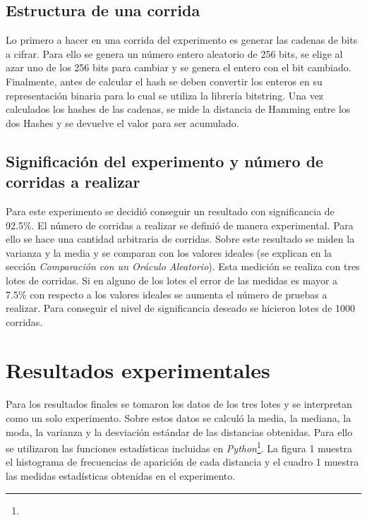 \documentclass[a4paper]{article}
\begin{document}
\subsection{Estructura de una corrida}
Lo primero a hacer en una corrida del experimento es generar las cadenas de bits a cifrar. Para ello se genera un número 
entero aleatorio de 256 bits, se elige al azar uno de los 256 bits para cambiar y se genera el entero con el bit cambiado. 
Finalmente, antes de calcular el hash se deben convertir los enteros en su representación binaria para lo cual se utiliza 
la librería bitstring. Una vez calculados los hashes de las cadenas, se mide la distancia de Hamming 
entre los dos Hashes y se devuelve el valor para ser acumulado.
 
 \subsection{Significación del experimento y número de corridas a realizar}
 Para este experimento se decidió conseguir un resultado con significancia de 92.5\%. El número de corridas a realizar 
 se definió de manera experimental. Para ello se hace una cantidad arbitraria de corridas. Sobre este resultado se miden
 la varianza y la media y se comparan con los valores ideales (se explican en la sección \emph{Comparación con un Oráculo Aleatorio}).
 Esta medición se realiza con tres lotes de corridas. Si en alguno de los lotes el error de las medidas es mayor a 7.5\% con 
 respecto a los valores ideales se aumenta el número de pruebas a realizar. Para conseguir el nivel de significancia deseado
 se hicieron lotes de 1000 corridas.

\section{Resultados experimentales}

Para los resultados finales se tomaron los datos de los tres lotes y se interpretan como un solo experimento. Sobre estos 
datos se calculó la media, la mediana, la moda, la varianza y la desviación estándar de las distancias obtenidas. Para ello se
utilizaron las funciones estadísticas incluidas en \emph{Python}\footnote{}. 
La figura 1 muestra el histograma de frecuencias de aparición de cada distancia y el cuadro 1 muestra las medidas estadísticas 
obtenidas en el experimento.

\begin{figure}
\begin{floatrow}
\end{floatrow}
\end{figure}
\end{document}

